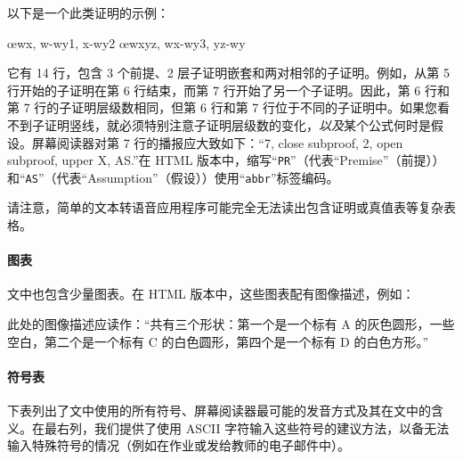 以下是一个此类证明的示例：
\begin{fitchproof}
\PR
{}\PR
{}\PR
\open
	\AS
	\open
		\AS
	\close
	\open
		\AS
	\close
	\oe{wx, w-wy1, x-wy2}
\close
\open
	\AS
\close
{}\oe{wxyz, wx-wy3, yz-wy}
\end{fitchproof}
它有 14 行，包含 3 个前提、2 层子证明嵌套和两对相邻的子证明。例如，从第 5 行开始的子证明在第 6 行结束，而第 7 行开始了另一个子证明。因此，第 6 行和第 7 行的子证明层级数相同，但第 6 行和第 7 行位于不同的子证明中。如果您看不到子证明竖线，就必须特别注意子证明层级数的变化，\emph{以及}某个公式何时是假设。屏幕阅读器对第 7 行的播报应大致如下：“7, close subproof, 2, open subproof, upper X, AS.”在 HTML 版本中，缩写“\verb|PR|”（代表“Premise”（前提））和“\verb|AS|”（代表“Assumption”（假设））使用“\verb|abbr|”标签编码。

请注意，简单的文本转语音应用程序可能完全无法读出包含证明或真值表等复杂表格。

\paragraph{图表}

文中也包含少量图表。在 HTML 版本中，这些图表配有图像描述，例如：
\begin{center}
\end{center}
此处的图像描述应读作：“共有三个形状：第一个是一个标有 A 的灰色圆形，一些空白，第二个是一个标有 C 的白色圆形，第四个是一个标有 D 的白色方形。”

\paragraph{符号表}

下表列出了文中使用的所有符号、屏幕阅读器最可能的发音方式及其在文中的含义。在最右列，我们提供了使用 ASCII 字符输入这些符号的建议方法，以备无法输入特殊符号的情况（例如在作业或发给教师的电子邮件中）。

